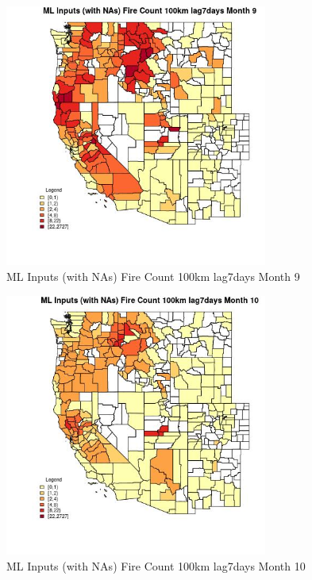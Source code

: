 \begin{figure} 
\centering  
\includegraphics[width=0.77\textwidth]{Code_Outputs/Report_ML_input_PM25_Step4_part_f_de_duplicated_aveswNAs_CountyFire_Count_100km_lag7daysmedianMonth9.jpg} 
\caption{\label{fig:Report_ML_input_PM25_Step4_part_f_de_duplicated_aveswNAsCountyFire_Count_100km_lag7daysmedianMonth9}ML Inputs (with NAs) Fire Count 100km lag7days Month 9} 
\end{figure} 
 

\begin{figure} 
\centering  
\includegraphics[width=0.77\textwidth]{Code_Outputs/Report_ML_input_PM25_Step4_part_f_de_duplicated_aveswNAs_CountyFire_Count_100km_lag7daysmedianMonth10.jpg} 
\caption{\label{fig:Report_ML_input_PM25_Step4_part_f_de_duplicated_aveswNAsCountyFire_Count_100km_lag7daysmedianMonth10}ML Inputs (with NAs) Fire Count 100km lag7days Month 10} 
\end{figure} 
 

